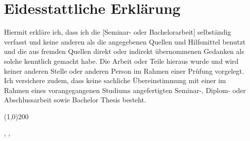 \section*{Eidesstattliche Erklärung}

Hiermit erkläre ich, dass ich die [Seminar- oder Bachelorarbeit] selbständig verfasst und keine anderen als die angegebenen Quellen und Hilfsmittel benutzt und die aus fremden Quellen direkt oder indirekt übernommenen Gedanken als solche kenntlich gemacht habe. Die Arbeit oder Teile hieraus wurde und wird keiner anderen Stelle oder anderen Person im Rahmen einer Prüfung vorgelegt. Ich versichere zudem, dass keine sachliche Übereinstimmung mit einer im Rahmen eines vorangegangenen Studiums angefertigten Seminar-, Diplom- oder Abschlussarbeit sowie Bachelor Thesis besteht.


\vspace*{1.5cm} 
\begin{center}
\line(1,0){200} 

\docCity, \docDeadline, ~~\docAuthor
\end{center}
